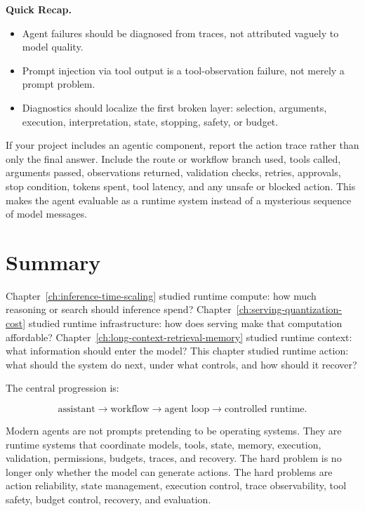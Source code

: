 \begin{quickrecap}
\textbf{Quick Recap.}
\begin{itemize}[nosep,leftmargin=1.5em]
  \item Agent failures should be diagnosed from traces, not attributed vaguely to model quality.
  \item Prompt injection via tool output is a tool-observation failure, not merely a prompt problem.
  \item Diagnostics should localize the first broken layer: selection, arguments, execution, interpretation, state, stopping, safety, or budget.
\end{itemize}
\end{quickrecap}

\begin{tcolorbox}[colback=blue!3, colframe=blue!45, title=\textbf{For Project 4: Report the Action Trace}]
If your project includes an agentic component, report the action trace rather than only the final answer. Include the route or workflow branch used, tools called, arguments passed, observations returned, validation checks, retries, approvals, stop condition, tokens spent, tool latency, and any unsafe or blocked action. This makes the agent evaluable as a runtime system instead of a mysterious sequence of model messages.
\end{tcolorbox}


\section{Summary}
\label{sec:ch21-summary}

Chapter~\ref{ch:inference-time-scaling} studied runtime compute: how much reasoning or search should inference spend? Chapter~\ref{ch:serving-quantization-cost} studied runtime infrastructure: how does serving make that computation affordable? Chapter~\ref{ch:long-context-retrieval-memory} studied runtime context: what information should enter the model? This chapter studied runtime action: what should the system do next, under what controls, and how should it recover?

The central progression is:

\[
\text{assistant} \rightarrow \text{workflow} \rightarrow \text{agent loop} \rightarrow \text{controlled runtime}.
\]

Modern agents are not prompts pretending to be operating systems. They are runtime systems that coordinate models, tools, state, memory, execution, validation, permissions, budgets, traces, and recovery. The hard problem is no longer only whether the model can generate actions. The hard problems are action reliability, state management, execution control, trace observability, tool safety, budget control, recovery, and evaluation.


